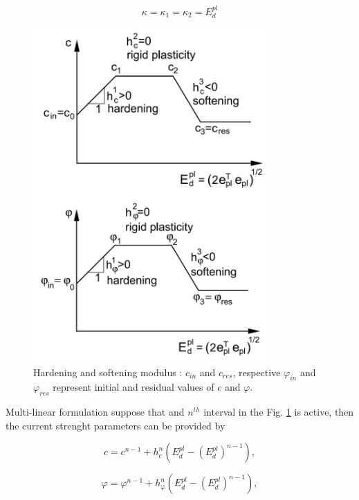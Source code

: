 \begin{equation}\label{eq:kappa}
	\kappa = \kappa_{1} = \kappa_{2} = E_d^{pl}
\end{equation}

\begin{figure}[h!]
	\centering	
	\includegraphics[width=0.8\textwidth, angle=0]{obrazky/hardening_softening_modulus.png}
	\caption[Hardening and softening modulus]{Hardening and softening modulus \cite{geofem}: $c_{in}$ and $c_{res}$, respective $\varphi_{in}$ and $\varphi_{res}$ represent initial and residual values of $c$ and $\varphi$.} \label{obr:H}
\end{figure}
 
Multi-linear formulation suppose that and $n^{th}$ interval in the Fig. \ref{obr:H} is active, then the current strenght parameters can be provided by

\begin{equation}\label{eq:c}
	c = c^{n-1} + h_c^n \left( E_d^{pl} -(E_d^{pl})^{n-1} \right),
\end{equation}

\begin{equation}\label{eq:phi}
\varphi = \varphi^{n-1} + h_\varphi^n\left( E_d^{pl} - (E_d^{pl})^{n-1} \right),
\end{equation}

